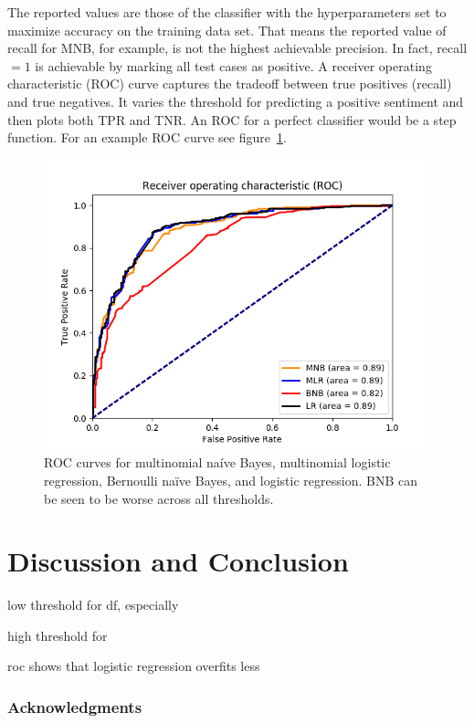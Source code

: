 \documentclass{article} %
\begin{document}
	The reported values are those of the classifier with the hyperparameters set to maximize accuracy on the training data set. That means the reported value of recall for MNB, for example, is not the highest achievable precision. In fact, recall $=1$ is achievable by marking all test cases as positive. A receiver operating characteristic (ROC) curve captures the tradeoff between true positives (recall) and true negatives. It varies the threshold for predicting a positive sentiment and then plots both TPR and TNR. An ROC for a perfect classifier would be a step function. For an example ROC curve see figure~\ref{fig:roc}.
	\begin{figure}[h]
		\centering
		\includegraphics[scale=.5]{ROC}
		\caption{ROC curves for multinomial na\'ive Bayes, multinomial logistic regression, Bernoulli na\"ive Bayes, and logistic regression. BNB can be seen to be worse across all thresholds.}
		\label{fig:roc}
	\end{figure}
		
	\section{Discussion and Conclusion}
	
	low threshold for df, especially 
	
	high threshold for 
	
	roc shows that logistic regression overfits less
	
	\subsubsection*{Acknowledgments}
	
	
	
	
	
\end{document}
